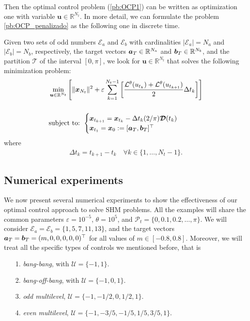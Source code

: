 \documentclass[9pt,shortpaper,twoside,web]{ieeecolor}
\begin{document}
Then the optimal control problem (\ref{pb:OCP1}) can be written as optimization one with variable $\bm{u} \in \mathbb{R}^{N_t}$. In more detail, we can formulate the problem \ref{pb:OCP_penalizado} as the following one in discrete time.

\begin{problem}\label{pb:numOCP2}
	Given two sets of odd numbers $\mathcal{E}_a$ and $\mathcal{E}_b$ with cardinalities $|\mathcal{E}_a| = N_a$ and $|\mathcal{E}_b| = N_b$, respectively, the target vectors $\bm{a}_T \in \mathbb{R}^{N_a}$ and $\bm{b}_T \in \mathbb{R}^{N_b}$, and the partition $\mathcal{T}$ of the interval $[0,\pi]$, we look for $\bm{u} \in \mathbb{R}^{N_t}$ that solves the following minimization problem:
	\begin{align*}
		&\min_{\bm{u} \in \mathbb{R}^{N_t}} \Bigg[\| \bm{x}_{N_t}\|^2 + \varepsilon \sum_{k=1}^{N_t-1} 
		\bigg[\frac{\mathcal{L}^\theta(u_{t_k}) + \mathcal{L}^\theta(u_{t_{k+1}})}{2}\Delta t_k \bigg]  \Bigg]  
		\\[15pt]
		&\notag \text{subject to: } \begin{cases}
			\bm{x}_{t_{k+1}} = \bm{x}_{t_k} - \Delta t_{k} (2/\pi) \bm{\mathcal{D}}(t_k)\\
			\bm{x}_{t_1} = \bm{x}_0:= [\bm{a}_T,\bm{b}_T]^\top
		\end{cases} 
	\end{align*}
	where 
	\begin{gather}
		\Delta t_{k} = t_{k+1} - t_{k} \hspace{1em} \forall k \in \{1,\dots,N_t-1\}.
	\end{gather}
\end{problem}

\subsection{Numerical experiments}

We now present several numerical experiments to show the effectiveness of our optimal control approach to solve SHM problems. All the examples will share the common parameters $\varepsilon = 10^{-5}$, $\theta = 10^5$, and $\mathcal{P}_t = \{0,0.1,0.2,\dots,\pi\}$. We will consider $\mathcal{E}_a = \mathcal{E}_b = \{1,5,7,11,13\}$, and the target vectors $\bm{a}_T = \bm{b}_T = (m,0,0,0,0,0)^\top$ for all values of $m \in [-0.8,0.8]$. Moreover, we will treat all the specific types of controls we mentioned before, that is
\begin{itemize}
	\item[1.] \emph{bang-bang}, with $\mathcal{U} = \{-1,1\}$.
	\vspace{0.05cm}
	\item[2.] \emph{bang-off-bang}, with $\mathcal{U} = \{-1,0,1\}$. 
	\vspace{0.05cm}
	\item[3.] \textit{odd multilevel}, $\mathcal{U} = \{-1,-1/2,0,1/2,1\}$.
 	\item[4.] \textit{even multilevel}, $\mathcal{U} = \{-1,-3/5,-1/5,1/5,3/5,1\}$.

\end{itemize}
\end{document}
